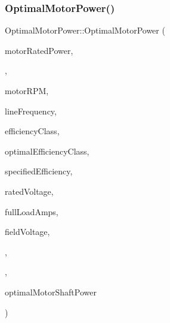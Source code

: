 \subsubsection{\texorpdfstring{Optimal\+Motor\+Power()}{OptimalMotorPower()}\hspace{0.1cm}{\footnotesize\ttfamily [3/3]}}
{\footnotesize\ttfamily Optimal\+Motor\+Power\+::\+Optimal\+Motor\+Power (\begin{DoxyParamCaption}\item[{double}]{motor\+Rated\+Power,  }\item[{double}]{,  }\item[{int}]{motor\+R\+PM,  }\item[{\hyperlink{class_motor_acee1bdf1b684ad36cb80dc2829d9fcee}{Motor\+::\+Line\+Frequency}}]{line\+Frequency,  }\item[{\hyperlink{class_motor_afa022971ae062406a9f588c601673d4e}{Motor\+::\+Efficiency\+Class}}]{efficiency\+Class,  }\item[{\hyperlink{class_motor_afa022971ae062406a9f588c601673d4e}{Motor\+::\+Efficiency\+Class}}]{optimal\+Efficiency\+Class,  }\item[{double}]{specified\+Efficiency,  }\item[{double}]{rated\+Voltage,  }\item[{double}]{full\+Load\+Amps,  }\item[{double}]{field\+Voltage,  }\item[{\hyperlink{class_field_data_a424e89914ba5684c01bb269dbe3312fd}{Field\+Data\+::\+Load\+Estimation\+Method}}]{,  }\item[{double}]{,  }\item[{double}]{optimal\+Motor\+Shaft\+Power }\end{DoxyParamCaption})\hspace{0.3cm}{\ttfamily [inline]}}

